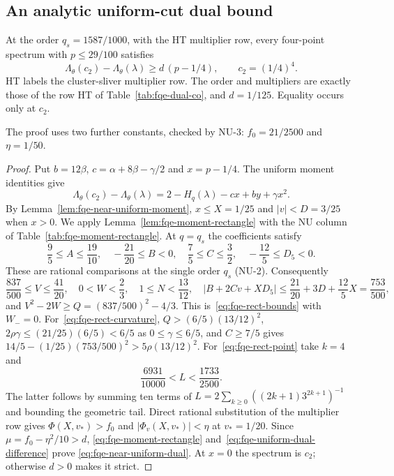\subsection{An analytic uniform-cut dual bound}\label{sec:sup-nu-dual}
\begin{lemma}
\label{lem:fqe-near-uniform-dual}
At the order $q_s=1587/1000$, with the HT multiplier row, every four-point spectrum
with $p\le29/100$ satisfies
\[
\Lambda_\theta(c_2)-\Lambda_\theta(\lambda)
\ge d\,(p-1/4),\qquad c_2=(1/4)^4.
\tag{ND}\label{eq:fqe-near-uniform-dual}
\]
HT labels the cluster-sliver multiplier row. The order and multipliers are exactly those of the row HT of
Table~\ref{tab:fqe-dual-co}, and $d=1/125$. Equality occurs only at $c_2$.
\end{lemma}
The proof uses two further constants, checked by NU-3: $f_0=21/2500$ and $\eta=1/50$.
\begin{proof}
Put $b=12\beta$, $c=\alpha+8\beta-\gamma/2$ and $x=p-1/4$.
The uniform moment identities give
\[
\Lambda_\theta(c_2)-\Lambda_\theta(\lambda)
=2-H_q(\lambda)-cx+by+\gamma x^2 .
\tag{UD}\label{eq:fqe-uniform-dual-difference}
\]
By Lemma~\ref{lem:fqe-near-uniform-moment}, $x\le X=1/25$ and $|v|<D=3/25$ when $x>0$. We apply
Lemma~\ref{lem:fqe-moment-rectangle} with the NU column of Table~\ref{tab:fqe-moment-rectangle}.
At $q=q_s$ the coefficients satisfy
\[
\frac95\le A\le\frac{19}{10},\quad
-\frac{21}{20}\le B<0,\quad
\frac75\le C\le\frac32,\quad -\frac{12}5\le D_5<0.
\]
These are rational comparisons at the single order $q_s$ (NU-2). Consequently
\[
\frac{837}{500}\le V\le\frac{41}{20},\quad
0<W<\frac23,\quad 1\le N<\frac{13}{12},\quad
|B+2Cv+XD_5|\le\frac{21}{20}+3D+\frac{12}5X=\frac{753}{500},
\]
and $V^2-2W\ge Q=(837/500)^2-4/3$. This is~\eqref{eq:fqe-rect-bounds} with $W_-=0$.
For~\eqref{eq:fqe-rect-curvature}, $Q>(6/5)(13/12)^2$, $2\rho\gamma\le(21/25)(6/5)<6/5$ as
$0\le\gamma\le6/5$, and $C\ge7/5$ gives
$14/5-(1/25)(753/500)^2>5\rho(13/12)^2$.
For~\eqref{eq:fqe-rect-point} take $k=4$ and
\[
\frac{6931}{10000}<L<\frac{1733}{2500}.
\]
The latter follows by summing ten terms of
$L=2\sum_{k\ge0}((2k+1)3^{2k+1})^{-1}$ and bounding the geometric tail.
Direct rational substitution of the multiplier row gives $\Phi(X,v_*)>f_0$ and
$|\Phi_v(X,v_*)|<\eta$ at $v_*=1/20$. Since $\mu=f_0-\eta^2/10>d$,
\eqref{eq:fqe-moment-rectangle} and~\eqref{eq:fqe-uniform-dual-difference} prove
\eqref{eq:fqe-near-uniform-dual}.
At $x=0$ the spectrum is $c_2$; otherwise $d>0$ makes it strict.
\end{proof}

